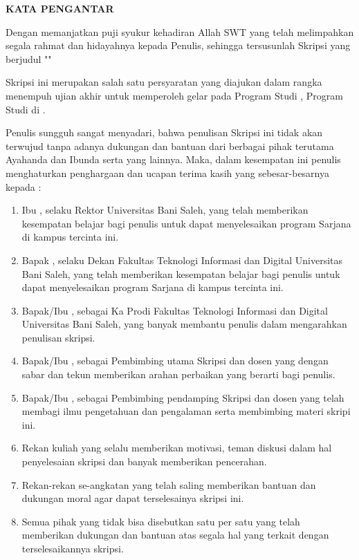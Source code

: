 
\clearpage
{}
{}
\begin{center}
    \textbf{\large KATA PENGANTAR}\\[3em]
\end{center}

Dengan memanjatkan puji syukur kehadiran Allah SWT yang telah melimpahkan segala rahmat dan hidayahnya kepada Penulis, sehingga tersusunlah Skripsi yang berjudul "\textbf{\judulid}"

Skripsi ini merupakan salah satu persyaratan yang diajukan dalam rangka menempuh ujian akhir untuk memperoleh gelar {\gelar} {\gelarsingkat} pada Program Studi {\prodi}, Program Studi {\prodi} di {\fakultas} {\universitas}.

Penulis sungguh sangat menyadari, bahwa penulisan Skripsi ini tidak akan terwujud tanpa adanya dukungan dan bantuan dari berbagai pihak terutama Ayahanda dan Ibunda serta yang lainnya. Maka, dalam kesempatan ini penulis menghaturkan penghargaan dan ucapan terima kasih yang sebesar-besarnya kepada :

\begin{enumerate}[leftmargin=0.5cm]
    \item Ibu \textbf{\rektor}, selaku Rektor Universitas Bani Saleh, yang telah memberikan kesempatan belajar bagi penulis untuk dapat menyelesaikan program Sarjana di kampus tercinta ini.
    \item Bapak \textbf{\dekan}, selaku Dekan Fakultas Teknologi Informasi dan Digital Universitas Bani Saleh, yang telah memberikan kesempatan belajar bagi penulis untuk dapat menyelesaikan program Sarjana di kampus tercinta ini.
    \item Bapak/Ibu \textbf{\kaprodi}, sebagai Ka Prodi Fakultas Teknologi Informasi dan Digital Universitas Bani Saleh, yang banyak membantu penulis dalam mengarahkan penulisan skripsi.
    \item Bapak/Ibu \textbf{\pembimbingutama}, sebagai Pembimbing utama Skripsi dan dosen yang dengan sabar dan tekun memberikan arahan perbaikan yang berarti bagi penulis.
    \item Bapak/Ibu \textbf{\pembimbingpendamping}, sebagai Pembimbing pendamping Skripsi dan dosen yang telah membagi ilmu pengetahuan dan pengalaman serta membimbing materi skripi ini.
    \item Rekan kuliah yang selalu memberikan motivasi, teman diskusi dalam hal penyelesaian skripsi dan banyak memberikan pencerahan.
    \item Rekan-rekan se-angkatan yang telah saling memberikan bantuan dan dukungan moral agar dapat terselesainya skripsi ini.
    \item Semua pihak yang tidak bisa disebutkan satu per satu yang telah memberikan dukungan dan bantuan atas segala hal yang terkait dengan terselesaikannya skripsi.
\end{enumerate}

